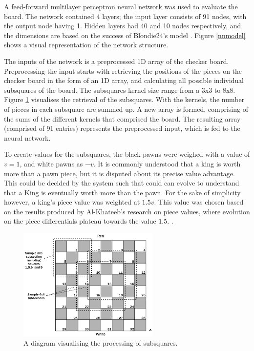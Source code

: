 \documentclass[12pt,a4paper]{article}
\begin{document}
        A feed-forward multilayer perceptron neural network was used to evaluate the board. The network contained 4 layers; the input layer consists of 91 nodes, with the output node having 1. Hidden layers had 40 and 10 nodes respectively, and the dimensions are based on the success of Blondie24's model \cite{chellapilla_evolving_1999}. Figure \ref{nnmodel} shows a visual representation of the network structure.

        The inputs of the network is a preprocessed 1D array of the checker board. Preprocessing the input starts with retrieving the positions of the pieces on the checker board in the form of an 1D array, and calculating all possible individual subsquares of the board. The subsquares kernel size range from a 3x3 to 8x8. Figure \ref{subsquares} visualises the retrieval of the subsquares. With the kernels, the number of pieces in each subsquare are summed up. A new array is formed, comprising of the sums of the different kernels that comprised the board. The resulting array (comprised of 91 entries) represents the preprocessed input, which is fed to the neural network.
        
        To create values for the subsquares, the black pawns were weighed with a value of $v=1$, and white pawns as $-v$. It is commonly understood that a king is worth more than a pawn piece, but it is disputed about its precise value advantage. This could be decided by the system such that could can evolve to understand that a King is eventually worth more than the pawn. For the sake of simplicity however, a king's piece value was weighted at $1.5v$. This value was chosen based on the results produced by Al-Khateeb's research on piece values, where evolution on the piece differentials plateau towards the value $1.5$. \cite{al-khateeb_importance_2010}.

        \begin{figure}[!ht]
            \centering
            \includegraphics[width=70mm]{images/subsquares.png}
            \caption{A diagram visualising the processing of subsquares.\label{subsquares}}
        \end{figure}
\end{document}
